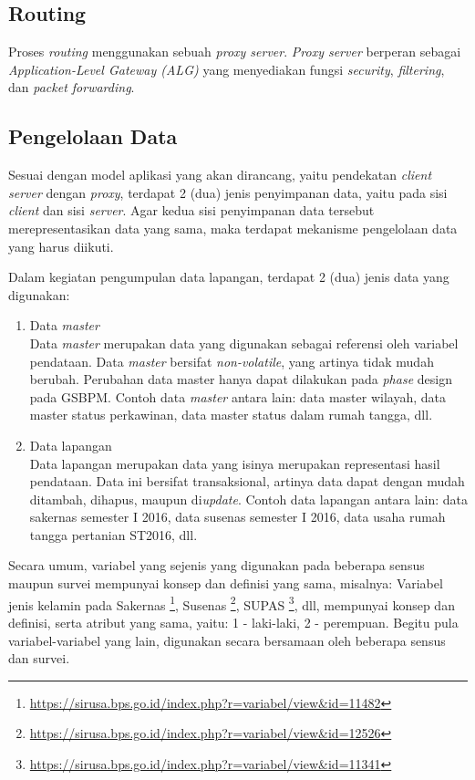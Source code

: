 \subsection{Routing}

Proses \textit{routing} menggunakan sebuah \textit{proxy server}. \textit{Proxy server} berperan sebagai \textit{Application-Level Gateway (ALG)} yang menyediakan fungsi \textit{security}, \textit{filtering}, dan \textit{packet forwarding}. 


\subsection{Pengelolaan Data}

Sesuai dengan model aplikasi yang akan dirancang, yaitu pendekatan \textit{client server} dengan \textit{proxy}, terdapat 2 (dua) jenis penyimpanan data, yaitu pada sisi \textit{client} dan sisi \textit{server}. Agar kedua sisi penyimpanan data tersebut merepresentasikan data yang sama, maka terdapat mekanisme pengelolaan data yang harus diikuti.

Dalam kegiatan pengumpulan data lapangan, terdapat 2 (dua) jenis data yang digunakan:

\begin{enumerate}
\item Data \textit{master} \\
Data \textit{master} merupakan data yang digunakan sebagai referensi oleh variabel pendataan. Data \textit{master} bersifat \textit{non-volatile}, yang artinya tidak mudah berubah. Perubahan data master hanya dapat dilakukan pada \textit{phase} design pada GSBPM. Contoh data \textit{master} antara lain: data master wilayah, data master status perkawinan, data master status dalam rumah tangga, dll.

\item Data lapangan \\
Data lapangan merupakan data yang isinya merupakan representasi hasil pendataan. Data ini bersifat transaksional, artinya data dapat dengan mudah ditambah, dihapus, maupun di\textit{update}. Contoh data lapangan antara lain: data sakernas semester I 2016, data susenas semester I 2016, data usaha rumah tangga pertanian ST2016, dll.
\end{enumerate}


Secara umum, variabel yang sejenis yang digunakan pada beberapa sensus maupun survei mempunyai konsep dan definisi yang sama, misalnya: Variabel jenis kelamin pada Sakernas \footnote{\url{https://sirusa.bps.go.id/index.php?r=variabel/view&id=11482}}, Susenas \footnote{\url{https://sirusa.bps.go.id/index.php?r=variabel/view&id=12526}}, SUPAS \footnote{\url{https://sirusa.bps.go.id/index.php?r=variabel/view&id=11341}}, dll, mempunyai konsep dan definisi, serta atribut yang sama, yaitu: 1 - laki-laki, 2 - perempuan. Begitu pula variabel-variabel yang lain, digunakan secara bersamaan oleh beberapa sensus dan survei.


